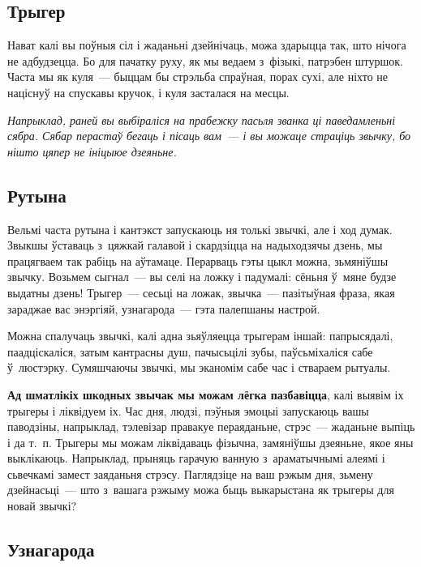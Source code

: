 \subsection*{Трыгер}

Нават калі вы поўныя сіл і жаданьні дзейнічаць, можа здарыцца так, што нічога не адбудзецца. Бо для пачатку руху, як мы ведаем з~фізыкі, патрэбен штуршок. Часта мы як куля~--- быццам бы стрэльба спраўная, порах сухі, але ніхто не націснуў на спускавы кручок, і куля засталася на месцы. 


\emph{Напрыклад, раней вы выбіраліся на прабежку пасьля званка ці паведамленьні сябра. Сябар перастаў бегаць і пісаць вам~--- і вы можаце страціць звычку, бо нішто цяпер не ініцыюе дзеяньне.}

\subsection*{Рутына}

Вельмі часта рутына і кантэкст запускаюць ня толькі звычкі, але і ход думак. Звыкшы ўставаць з~цяжкай галавой і скардзіцца на надыходзячы дзень, мы працягваем так рабіць на аўтамаце. Перарваць гэты цыкл можна, зьмяніўшы звычку. Возьмем сыгнал~--- вы селі на ложку і падумалі: сёньня ў~мяне будзе выдатны дзень! Трыгер~--- сесьці на ложак, звычка~--- пазітыўная фраза, якая зараджае вас энэргіяй, узнагарода~--- гэта палепшаны настрой.

Можна спалучаць звычкі, калі адна зьяўляецца трыгерам іншай: папрысядалі, паадціскаліся, затым кантрасны душ, пачысьцілі зубы, паўсьміхаліся сабе ў~люстэрку. Сумяшчаючы звычкі, мы эканомім сабе час і ствараем рытуалы.

\textbf{Ад шматлікіх шкодных звычак мы можам лёгка пазбавіцца}, калі выявім іх трыгеры і ліквідуем іх. Час дня, людзі, пэўныя эмоцыі запускаюць вашы паводзіны, напрыклад, тэлевізар правакуе пераяданьне, стрэс~--- жаданьне выпіць і да т.~п. Трыгеры мы можам ліквідаваць фізычна, замяніўшы дзеяньне, якое яны выклікаюць. Напрыклад, прыняць гарачую ванную з~араматычнымі алеямі і сьвечкамі замест заяданьня стрэсу. Паглядзіце на ваш рэжым дня, зьмену дзейнасьці~--- што з~вашага рэжыму можа быць выкарыстана як трыгеры для новай звычкі?

\subsection*{Узнагарода}

